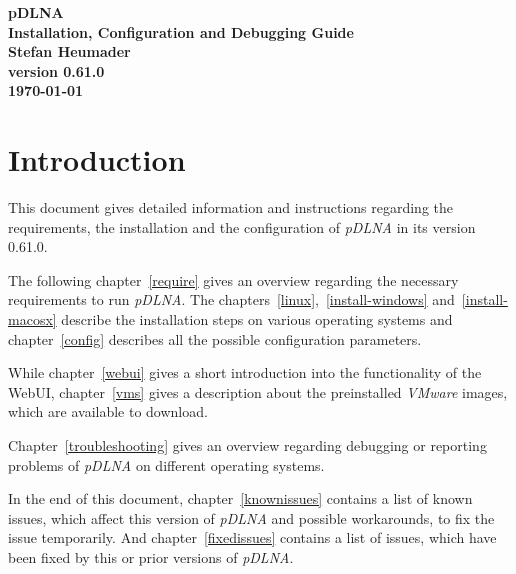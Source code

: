 \documentclass[a4paper,oneside,10pt]{report}
\newcommand{\pDLNAversion}{0.61.0}
\begin{document}
\pagestyle{empty}

\thispagestyle{empty}
\begin{center}
\Huge{\textbf{pDLNA}}\\
\vspace{0.5cm}
\Large{\textbf{Installation, Configuration and Debugging Guide}}\\
\vspace{2cm}
\large{\textbf{Stefan Heumader}}\\
\vspace{1cm}
\large{\textbf{version \pDLNAversion}}\\
\vspace{0.5cm}
\large{\textbf{\today}}\\
\end{center}

\tableofcontents
\cleardoublepage

\pagestyle{headings}

%
%

\chapter{Introduction}

This document gives detailed information and instructions regarding the requirements, the installation and the configuration of {\em pDLNA} in its version \pDLNAversion.

The following chapter~\ref{require} gives an overview regarding the necessary requirements to run {\em pDLNA}. The chapters~\ref{linux},~\ref{install-windows} and~\ref{install-macosx} describe the installation steps on various operating systems and chapter~\ref{config} describes all the possible configuration parameters.

While chapter~\ref{webui} gives a short introduction into the functionality of the WebUI, chapter~\ref{vms} gives a description about the preinstalled {\em VMware} images, which are available to download.

Chapter~\ref{troubleshooting} gives an overview regarding debugging or reporting problems of {\em pDLNA} on different operating systems.

In the end of this document, chapter~\ref{knownissues} contains a list of known issues, which affect this version of {\em pDLNA} and possible workarounds, to fix the issue temporarily. And chapter~\ref{fixedissues} contains a list of issues, which have been fixed by this or prior versions of {\em pDLNA}.
\end{document}
